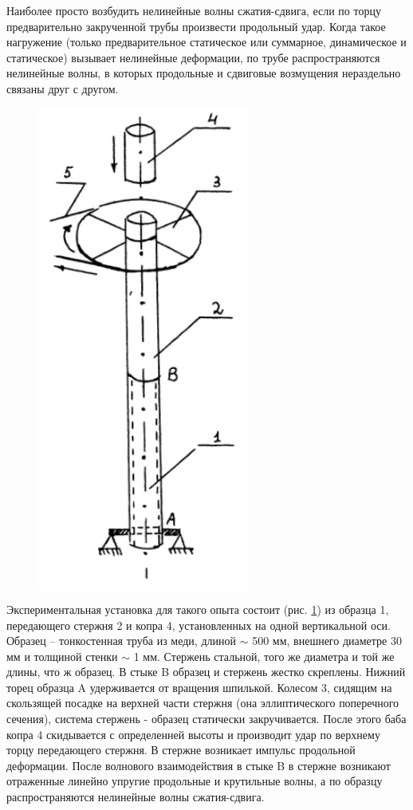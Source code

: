 \documentclass[specialist, subf, href, colorlinks=true, 14pt, final]{disser}
\theoremstyle{definition}
\begin{document}
Наиболее просто возбудить нелинейные волны сжатия-сдвига,
если по торцу предварительно закрученной трубы произвести 
продольный удар. Когда такое нагружение (только предварительное
статическое или суммарное, динамическое и статическое) вызывает
нелинейные деформации, по трубе распространяются нелинейные 
волны, в которых продольные и сдвиговые возмущения нераздельно 
связаны друг с другом.
\begin{figure} 
  \includegraphics[width=70mm]{pics/2-3-4.png}
  \caption{}
  \label{2-3-4}
\end{figure}
Экспериментальная установка для
такого опыта состоит (рис. \ref{2-3-4}) из образца 1, передающего стержня 2 и копра 4, установленных на одной вертикальной оси. Образец -- тонкостенная труба из меди, длиной $\sim$ 500 мм, внешнего диаметре 30 мм и толщиной стенки $\sim$ 1 мм. Стержень стальной, того же диаметра и той же длины, что ж образец. В стыке B образец и стержень жестко скреплены. Нижний торец образца A удерживается от вращения шпилькой. Колесом 3, сидящим на скользящей посадке на верхней части стержня (она  эллиптического поперечного сечения), система стержень - образец статически закручивается. После этого баба копра 4 скидывается с определенней высоты и производит удар по верхнему торцу передающего стержня. В стержне возникает импульс продольной деформации. После волнового взаимодействия в стыке B в стержне возникают отраженные линейно упругие продольные и крутильные волны, а по образцу распространяются нелинейные волны сжатия-сдвига.
\end{document}
